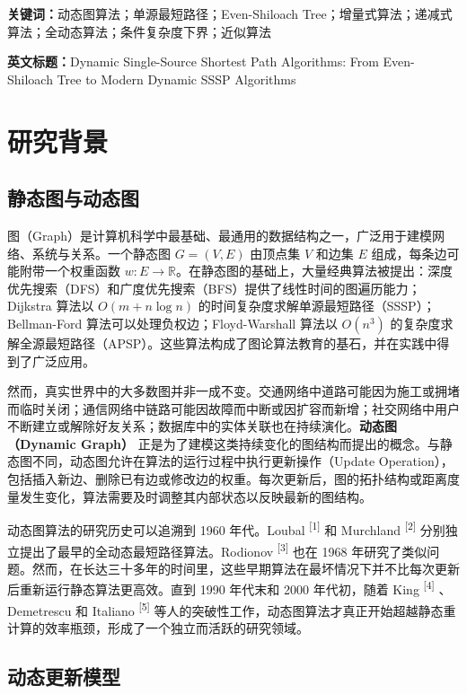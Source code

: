 \documentclass[12pt,a4paper]{ctexart}
\newcommand{\keywords}[1]{\vspace{0.5em}\noindent\textbf{关键词：}#1}
\let\oldsection\section
\renewcommand{\section}{\clearpage\oldsection}
\begin{document}
\keywords{动态图算法；单源最短路径；Even-Shiloach Tree；增量式算法；递减式算法；全动态算法；条件复杂度下界；近似算法}

\vspace{1em}
\noindent\textbf{英文标题：}Dynamic Single-Source Shortest Path Algorithms: From Even-Shiloach Tree to Modern Dynamic SSSP Algorithms

\clearpage
\tableofcontents
\clearpage

\section{研究背景}

\subsection{静态图与动态图}

图（Graph）是计算机科学中最基础、最通用的数据结构之一，广泛用于建模网络、系统与关系。一个静态图 $G=(V,E)$ 由顶点集 $V$ 和边集 $E$ 组成，每条边可能附带一个权重函数 $w:E\to\mathbb{R}$。在静态图的基础上，大量经典算法被提出：深度优先搜索（DFS）和广度优先搜索（BFS）提供了线性时间的图遍历能力；Dijkstra 算法以 $O(m+n\log n)$ 的时间复杂度求解单源最短路径（SSSP）；Bellman-Ford 算法可以处理负权边；Floyd-Warshall 算法以 $O(n^3)$ 的复杂度求解全源最短路径（APSP）。这些算法构成了图论算法教育的基石，并在实践中得到了广泛应用。

然而，真实世界中的大多数图并非一成不变。交通网络中道路可能因为施工或拥堵而临时关闭；通信网络中链路可能因故障而中断或因扩容而新增；社交网络中用户不断建立或解除好友关系；数据库中的实体关联也在持续演化。\textbf{动态图（Dynamic Graph）} 正是为了建模这类持续变化的图结构而提出的概念。与静态图不同，动态图允许在算法的运行过程中执行更新操作（Update Operation），包括插入新边、删除已有边或修改边的权重。每次更新后，图的拓扑结构或距离度量发生变化，算法需要及时调整其内部状态以反映最新的图结构。

动态图算法的研究历史可以追溯到 1960 年代。Loubal \textsuperscript{[1]}  和 Murchland \textsuperscript{[2]}  分别独立提出了最早的全动态最短路径算法。Rodionov \textsuperscript{[3]}  也在 1968 年研究了类似问题。然而，在长达三十多年的时间里，这些早期算法在最坏情况下并不比每次更新后重新运行静态算法更高效。直到 1990 年代末和 2000 年代初，随着 King \textsuperscript{[4]} 、Demetrescu 和 Italiano \textsuperscript{[5]}  等人的突破性工作，动态图算法才真正开始超越静态重计算的效率瓶颈，形成了一个独立而活跃的研究领域。

\subsection{动态更新模型}
\end{document}
